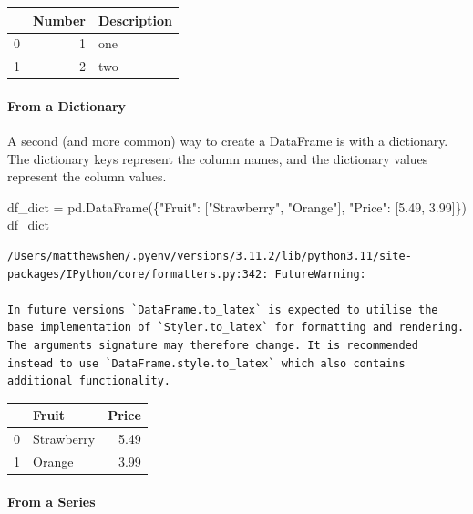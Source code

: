 \documentclass[
  letterpaper,
  DIV=11,
  numbers=noendperiod]{scrreprt}
\let\oldparagraph\paragraph
\renewcommand{\paragraph}[1]{\oldparagraph{#1}\mbox{}}
\newenvironment{Shaded}{\begin{snugshade}}{\end{snugshade}}
\newcommand{\FloatTok}[1]{\textcolor[rgb]{0.68,0.00,0.00}{#1}}
\newcommand{\NormalTok}[1]{\textcolor[rgb]{0.00,0.23,0.31}{#1}}
\newcommand{\OperatorTok}[1]{\textcolor[rgb]{0.37,0.37,0.37}{#1}}
\newcommand{\StringTok}[1]{\textcolor[rgb]{0.13,0.47,0.30}{#1}}
\begin{document}
\begin{tabular}{lrl}
\toprule
{} &  Number & Description \\
\midrule
0 &       1 &         one \\
1 &       2 &         two \\
\bottomrule
\end{tabular}

\hypertarget{from-a-dictionary}{%
\paragraph{From a Dictionary}\label{from-a-dictionary}}

A second (and more common) way to create a DataFrame is with a
dictionary. The dictionary keys represent the column names, and the
dictionary values represent the column values.

\begin{Shaded}
\begin{Highlighting}[]
\NormalTok{df\_dict }\OperatorTok{=}\NormalTok{ pd.DataFrame(\{}\StringTok{"Fruit"}\NormalTok{: [}\StringTok{"Strawberry"}\NormalTok{, }\StringTok{"Orange"}\NormalTok{], }\StringTok{"Price"}\NormalTok{: [}\FloatTok{5.49}\NormalTok{, }\FloatTok{3.99}\NormalTok{]\})}
\NormalTok{df\_dict}
\end{Highlighting}
\end{Shaded}

\begin{verbatim}
/Users/matthewshen/.pyenv/versions/3.11.2/lib/python3.11/site-packages/IPython/core/formatters.py:342: FutureWarning:

In future versions `DataFrame.to_latex` is expected to utilise the base implementation of `Styler.to_latex` for formatting and rendering. The arguments signature may therefore change. It is recommended instead to use `DataFrame.style.to_latex` which also contains additional functionality.
\end{verbatim}

\begin{tabular}{llr}
\toprule
{} &       Fruit &  Price \\
\midrule
0 &  Strawberry &   5.49 \\
1 &      Orange &   3.99 \\
\bottomrule
\end{tabular}

\hypertarget{from-a-series}{%
\paragraph{From a Series}\label{from-a-series}}
\end{document}
